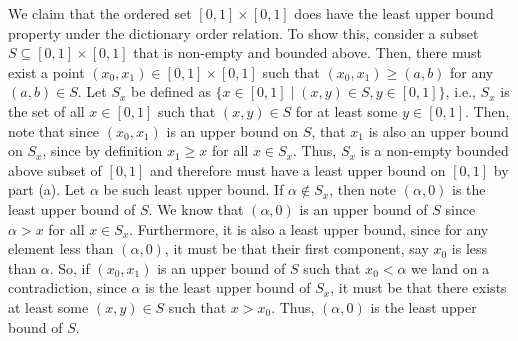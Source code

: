 \documentclass[12pt]{article}
\begin{document}
\begin{enumerate}[label=(\alph*)]
	We claim that the ordered set $[0, 1] \times [0,1]$ does have the least upper bound property under 
	the dictionary order relation. To show this, consider a subset $S \subseteq [0, 1] \times [0,1]$ that 
	is non-empty and bounded above. Then, there must exist a point $(x_0, x_1) \in [0, 1] \times [0,1]$
	such that $(x_0, x_1) \geq (a, b)$ for any $(a, b) \in S$. Let $S_x$ be defined as
	$\{x \in [0, 1] \mid (x, y) \in S, y \in [0, 1]\}$, i.e., $S_x$ is the set of all $x \in [0, 1]$
	such that $(x, y) \in S$ for at least some $y \in [0, 1]$. Then, note that since $(x_0, x_1)$ is an 
	upper bound on $S$, that $x_1$ is also an upper bound on $S_x$, since by definition $x_1 \geq x$ for 
	all $x \in S_x$. Thus, $S_x$ is a non-empty bounded above subset of $[0,1]$ and therefore must have 
	a least upper bound on $[0, 1]$ by part (a). Let $\alpha$ be such least upper bound. If $\alpha \notin S_x$,
	then note $(\alpha, 0)$ is the least upper bound of $S$. We know that $(\alpha, 0)$ is an upper bound of 
	$S$ since $\alpha > x$ for all $x \in S_x$. Furthermore, it is also a least upper bound, since for any 
	element less than $(\alpha, 0)$, it must be that their first component, say $x_0$ is less than $\alpha$.
	So, if $(x_0, x_1)$ is an upper bound of $S$ such that $x_0 < \alpha$ we land on a contradiction, since 
	$\alpha$ is the least upper bound of $S_x$, it must be that there exists at least some $(x, y) \in S$
	such that $x > x_0$. Thus, $(\alpha, 0)$ is the least upper bound of $S$.
	

\end{enumerate}
\end{document}
